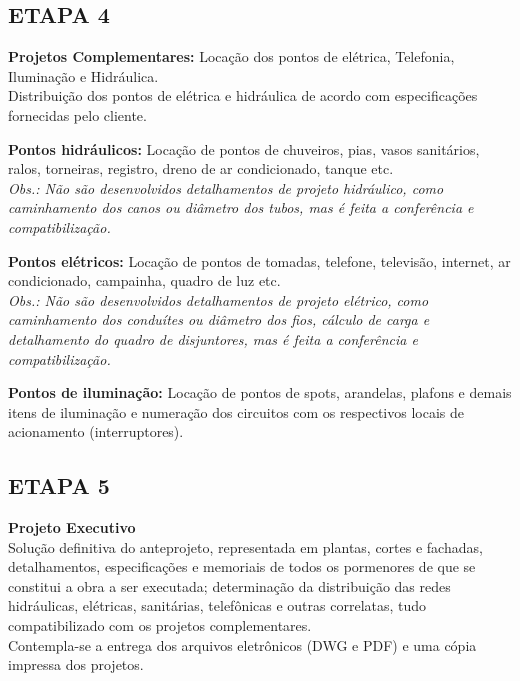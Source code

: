 \documentclass[11pt,a4paper]{article}
\begin{document}
\vspace{0.5cm}
\begin{minipage}{\textwidth}
\subsection*{ETAPA 4}
\textbf{Projetos Complementares:} Locação dos pontos de elétrica, Telefonia, Iluminação e Hidráulica. \\
Distribuição dos pontos de elétrica e hidráulica de acordo com especificações fornecidas pelo cliente.

\vspace{0.2cm}
\noindent\textbf{Pontos hidráulicos:} Locação de pontos de chuveiros, pias, vasos sanitários, ralos, torneiras, registro, dreno de ar condicionado, tanque etc. \\
\textit{\small Obs.: Não são desenvolvidos detalhamentos de projeto hidráulico, como caminhamento dos canos ou diâmetro dos tubos, mas é feita a conferência e compatibilização.}

\vspace{0.2cm}
\noindent\textbf{Pontos elétricos:} Locação de pontos de tomadas, telefone, televisão, internet, ar condicionado, campainha, quadro de luz etc. \\
\textit{\small Obs.: Não são desenvolvidos detalhamentos de projeto elétrico, como caminhamento dos conduítes ou diâmetro dos fios, cálculo de carga e detalhamento do quadro de disjuntores, mas é feita a conferência e compatibilização.}

\vspace{0.2cm}
\noindent\textbf{Pontos de iluminação:} Locação de pontos de spots, arandelas, plafons e demais itens de iluminação e numeração dos circuitos com os respectivos locais de acionamento (interruptores).
\end{minipage}

\vspace{0.5cm}
\subsection*{ETAPA 5}
\textbf{Projeto Executivo} \\
Solução definitiva do anteprojeto, representada em plantas, cortes e fachadas, detalhamentos, especificações e memoriais de todos os pormenores de que se constitui a obra a ser executada; determinação da distribuição das redes hidráulicas, elétricas, sanitárias, telefônicas e outras correlatas, tudo compatibilizado com os projetos complementares. \\
Contempla-se a entrega dos arquivos eletrônicos (DWG e PDF) e uma cópia impressa dos projetos.
\end{document}
